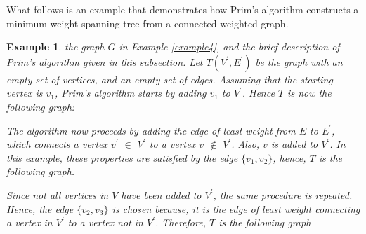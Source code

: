 \documentclass[12pt]{article}
\newtheorem{example}[definition]{Example}
\numberwithin{equation}{subsection}
\numberwithin{table}{subsection}
\numberwithin{algorithm}{subsection}
\numberwithin{figure}{subsection}
\begin{document}
What follows is an example that demonstrates how Prim's algorithm constructs a minimum weight spanning tree from a connected weighted graph.
\begin{example}
\label{example_prim}
 the graph $G$ in Example \ref{example4}, and the brief description of Prim's algorithm given in this subsection. Let $T(V^\prime,E^\prime)$ be the graph with an empty set of vertices, and an empty set of edges. Assuming that the starting vertex is $v_1$, Prim's algorithm starts by adding $v_1$ to $V^\prime$. Hence $T$ is now the following graph:
\begin{center}
\end{center}
The algorithm now proceeds by adding the edge of least weight from $E$ to $E^\prime$, which connects a vertex $v^\prime$ $\in$ $V^\prime$ to a vertex $v$ $\notin$ $V^\prime$. Also, $v$ is added to $V^\prime$. In this example, these properties are satisfied by the edge $\{v_1, v_2\}$, hence, $T$ is the following graph.
\begin{center}
\end{center}
Since not all vertices in $V$ have been added to $V^\prime$, the same procedure is repeated. Hence, the edge $\{v_2, v_3\}$ is chosen because, it is the edge of least weight connecting a vertex in $V^\prime$ to a vertex not in $V^\prime$. Therefore, $T$ is the following graph
\begin{center}
\begin{tikzpicture}[
    > = , %
    shorten > = 1pt, %
    auto,
    node distance = 3cm, %
    semithick %
    ]


\end{tikzpicture}
\end{center}
\end{example}
\end{document}
